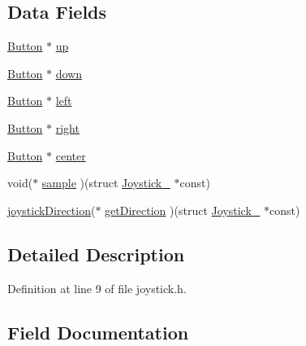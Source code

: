 \subsection*{Data Fields}
\begin{DoxyCompactItemize}
\item 
\mbox{\hyperlink{button_8h_ab369ab7fa0b9a8dfec4fc1f653ac6de5}{Button}} $\ast$ \mbox{\hyperlink{struct_joystick___aae2bb22ae710c823853d95ae7057884e}{up}}
\item 
\mbox{\hyperlink{button_8h_ab369ab7fa0b9a8dfec4fc1f653ac6de5}{Button}} $\ast$ \mbox{\hyperlink{struct_joystick___a9031d6ddde18c7b16c3242e403f3fbce}{down}}
\item 
\mbox{\hyperlink{button_8h_ab369ab7fa0b9a8dfec4fc1f653ac6de5}{Button}} $\ast$ \mbox{\hyperlink{struct_joystick___a571327757de519da4471010fe0d1e2c5}{left}}
\item 
\mbox{\hyperlink{button_8h_ab369ab7fa0b9a8dfec4fc1f653ac6de5}{Button}} $\ast$ \mbox{\hyperlink{struct_joystick___aa9275d605c1c2da3651589e1d55f9a1a}{right}}
\item 
\mbox{\hyperlink{button_8h_ab369ab7fa0b9a8dfec4fc1f653ac6de5}{Button}} $\ast$ \mbox{\hyperlink{struct_joystick___aa3ad087af028303e400a233a45d87aa2}{center}}
\item 
void($\ast$ \mbox{\hyperlink{struct_joystick___ad68253aed96c4f9e100a9fe238eea009}{sample}} )(struct \mbox{\hyperlink{struct_joystick__}{Joystick\+\_\+}} $\ast$const)
\item 
\mbox{\hyperlink{joystick_8h_ae3f9f641c46a8d3110940cc41d5a50c3}{joystick\+Direction}}($\ast$ \mbox{\hyperlink{struct_joystick___a95b0c18851cf4ff20aedac4196da5e17}{get\+Direction}} )(struct \mbox{\hyperlink{struct_joystick__}{Joystick\+\_\+}} $\ast$const)
\end{DoxyCompactItemize}


\subsection{Detailed Description}


Definition at line 9 of file joystick.\+h.



\subsection{Field Documentation}
\mbox{\label{struct_joystick___aa3ad087af028303e400a233a45d87aa2}} 
